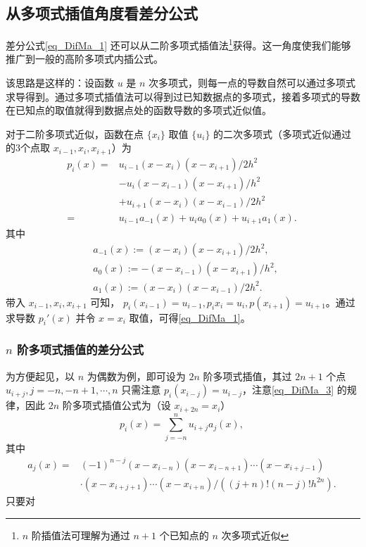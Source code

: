 \subsection{从多项式插值角度看差分公式}
差分公式\autoref{eq_DifMa_1} 还可以从二阶多项式插值法\footnote{$n$ 阶插值法可理解为通过 $n+1$ 个已知点的 $n$ 次多项式近似}获得。这一角度使我们能够推广到一般的高阶多项式内插公式。

该思路是这样的：设函数 $u$ 是 $n$ 次多项式，则每一点的导数自然可以通过多项式求导得到。通过多项式插值法可以得到过已知数据点的多项式，接着多项式的导数在已知点的取值就得到数据点处的函数导数的多项式近似值。

对于二阶多项式近似，函数在点 $\{x_i\}$ 取值 $\{u_i\}$ 的二次多项式（多项式近似通过的3个点取 $x_{i-1},x_i,x_{i+1}$）为
\begin{equation}\label{eq_DifMa_3}
\begin{aligned}
p_i(x)=&u_{i-1}(x-x_i)(x-x_{i+1})/2h^2\\
&-u_{i}(x-x_{i-1})(x-x_{i+1})/h^2\\
&+u_{i+1}(x-x_i)(x-x_{i-1})/2h^2\\
=& u_{i-1}a_{-1}(x)+u_{i}a_0(x)+u_{i+1}a_1(x).
\end{aligned}~
\end{equation}
 其中
 \begin{equation}
 \begin{aligned}
 & a_{-1}(x):=(x-x_i)(x-x_{i+1})/2h^2,\\
 &a_{0}(x):=-(x-x_{i-1})(x-x_{i+1})/h^2,\\
 &a_{1}(x):=(x-x_i)(x-x_{i-1})/2h^2.
 \end{aligned}~
 \end{equation}
 带入 $x_{i-1},x_i,x_{i+1}$ 可知， $p_i(x_{i-1})=u_{i-1},p_i{x_{i}}=u_i,p(x_{i+1})=u_{i+1}$。通过求导数 $p_i'(x)$ 并令 $x=x_i$ 取值，可得\autoref{eq_DifMa_1}。

\subsubsection{$n$ 阶多项式插值的差分公式}
为方便起见，以 $n$ 为偶数为例，即可设为 $2n$ 阶多项式插值，其过 $2n+1$ 个点 $u_{i+j},j=-n,-n+1,\cdots ,n$ 只需注意 $p_i(x_{i-j})=u_{i-j}$，注意\autoref{eq_DifMa_3} 的规律，因此 $2n$ 阶多项式插值公式为（设 $x_{i+2n}=x_i$）
\begin{equation}
p_i(x)=\sum_{j=-n}^n u_{i+j}a_{j}(x),~
\end{equation}
其中 
\begin{equation}
\begin{aligned}
a_{j}(x)=&(-1)^{n-j}(x-x_{i-n})(x-x_{i-n+1})\cdots(x-x_{i+j-1})\\
&\cdot(x-x_{i+j+1})\cdots(x-x_{i+n})/((j+n)!(n-j)!h^{2n}).
\end{aligned}~
\end{equation}
只要对


